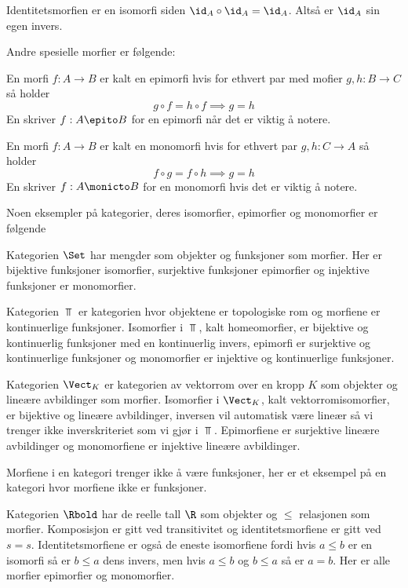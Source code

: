\begin{remark}\label{Rem:IdIso}
    Identitetsmorfien er en isomorfi siden $\id_A\circ\id_A = \id_A$. Altså er $\id_A$ sin egen invers.
\end{remark}

Andre spesielle morfier er følgende:
\begin{definition}\label{Def:Epi}
    En morfi $f: A\to B$ er kalt en epimorfi hvis for ethvert par med mofier $g,h: B\to C$ så holder
    \[g\circ f = h\circ f \implies g = h\]
    En skriver $f:A\epito B$ for en epimorfi når det er viktig å notere.
\end{definition}

\begin{definition}\label{Def:Mono}
    En morfi $f: A\to B$ er kalt en monomorfi hvis for ethvert par $g,h: C\to A$ så holder
    \[f\circ g = f\circ h \implies g=h\]
    En skriver $f: A\monicto B$ for en monomorfi hvis det er viktig å notere.
\end{definition}

Noen eksempler på kategorier, deres isomorfier, epimorfier og monomorfier er følgende
\begin{example}\label{Ex:Set}
    Kategorien $\Set$ har mengder som objekter og funksjoner som morfier. Her er bijektive funksjoner isomorfier, surjektive funksjoner epimorfier og injektive funksjoner er monomorfier.
\end{example}

\begin{example}\label{Ex:TopKat}
    Kategorien $\Top$ er kategorien hvor objektene er topologiske rom og morfiene er kontinuerlige funksjoner. Isomorfier i $\Top$, kalt homeomorfier, er bijektive og kontinuerlig funksjoner med en kontinuerlig invers, epimorfi er surjektive og kontinuerlige funksjoner og monomorfier er injektive og kontinuerlige funksjoner. 
\end{example}

\begin{example}\label{Ex:VektKat}
    Kategorien $\Vect_K$ er kategorien av vektorrom over en kropp $K$ som objekter og lineære avbildinger som morfier. Isomorfier i $\Vect_K$, kalt vektorromisomorfier, er bijektive og lineære avbildinger, inversen vil automatisk være lineær så vi trenger ikke inverskriteriet som vi gjør i $\Top$. Epimorfiene er surjektive lineære avbildinger og monomorfiene er injektive lineære avbildinger.
\end{example}

Morfiene i en kategori trenger ikke å være funksjoner, her er et eksempel på en kategori hvor morfiene ikke er funksjoner.
\begin{example}\label{Ex:RPoset}
    Kategorien $\Rbold$ har de reelle tall $\R$ som objekter og $\leq$ relasjonen som morfier. Komposisjon er gitt ved transitivitet og identitetsmorfiene er gitt ved $s=s$. Identitetsmorfiene er også de eneste isomorfiene fordi hvis $a\leq b$ er en isomorfi så er $b\leq a$ dens invers, men hvis $a\leq b$ og $b\leq a$ så er $a=b$. Her er alle morfier epimorfier og monomorfier.
\end{example}

